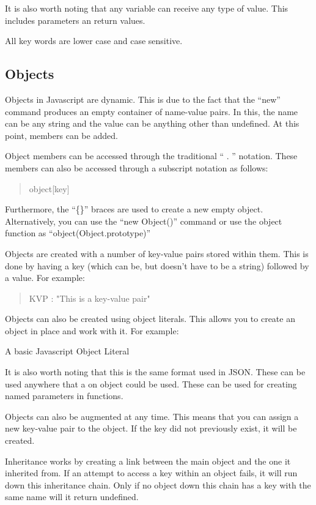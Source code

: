 \documentclass[a4paper,11pt]{report}
\begin{document}
			It is also worth noting that any variable can receive any type of value. 
			This includes parameters an return values. 
			
			All key words are lower case and case sensitive. 
		\subsection{Objects}
			Objects in Javascript are dynamic. 
			This is due to the fact that the ``new'' command produces an empty container of name-value pairs.
			In this, the name can be any string and the value can be anything other than undefined. 
			At this point, members can be added. 
			
			Object members can be accessed through the traditional `` . '' notation. 
			These members can also be accessed through a subscript notation as follows:
			\begin{quote}
				object[key]
			\end{quote}
			Furthermore, the ``\{\}'' braces are used to create a new empty object. 
			Alternatively, you can use the ``new Object()'' command or 
			use the object function as ``object(Object.prototype)''

			Objects are created with a number of key-value pairs stored within them. 
			This is done by having a key (which can be, but doesn't have to be a string) followed by a value. 
			For example:
			\begin{quote}
				KVP : "This is a key-value pair"
			\end{quote}
			 
			Objects can also be created using object literals. 
			This allows you to create an object in place and work with it.
			For example:
			\begin{code}
				
				\caption{A basic Javascript Object Literal}
				\label{code:JSObjectLiteral}
			\end{code}
			It is also worth noting that this is the same format used in JSON. 
			These can be used anywhere that a on object could be used. 
			These can be used for creating named parameters in functions. 

			Objects can also be augmented at any time. 
			This means that you can assign a new key-value pair to the object. 
			If the key did not previously exist, it will be created. 

			Inheritance works by creating a link between the main object and the one it inherited from. 
			If an attempt to access a key within an object fails, it will run down this inheritance chain. 
			Only if no object down this chain has a key with the same name will it return undefined. 
			
\end{document}
